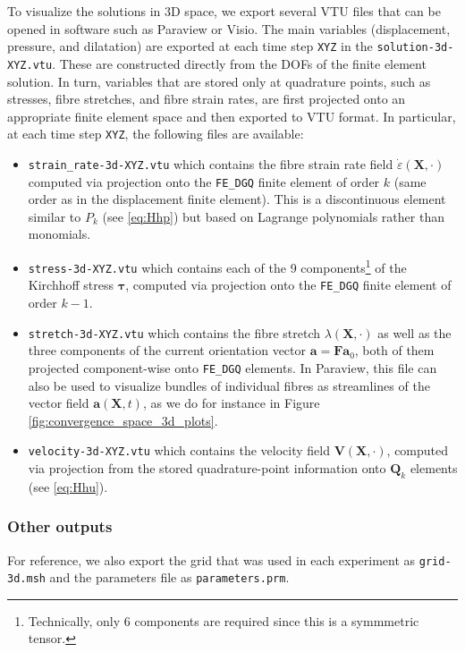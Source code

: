 \documentclass{sfuthesis}
\numberwithin{equation}{section}
\numberwithin{figure}{chapter}
\numberwithin{table}{chapter}
\theoremstyle{definition}
\def\*#1{{\mathbf{#1}}} %
\newcommand{\depsilon}{\dot{\varepsilon}}
\def\btau{{\bm{\tau}}}
\begin{document}
To visualize the solutions in 3D space, we export several VTU files that can be opened in software such as Paraview or Visio. The main variables (displacement, pressure, and dilatation) are exported at each time step \texttt{XYZ} in the \texttt{solution-3d-XYZ.vtu}. These are constructed directly from the DOFs of the finite element solution. In turn, variables that are stored only at quadrature points, such as stresses, fibre stretches, and fibre strain rates, are first projected onto an appropriate finite element space and then exported to VTU format. In particular, at each time step \texttt{XYZ}, the following files are available:
\begin{itemize}
    \item \texttt{strain\_rate-3d-XYZ.vtu} which contains the fibre strain rate field $\depsilon(\*X,\cdot)$ computed via projection onto the \texttt{FE\_DGQ} finite element of order $k$ (same order as in the displacement finite element). This is a discontinuous element similar to $P_k$ (see \eqref{eq:Hhp}) but based on Lagrange polynomials rather than monomials.
    \item \texttt{stress-3d-XYZ.vtu} which contains each of the 9 components\footnote{Technically, only 6 components are required since this is a symmmetric tensor.} of the Kirchhoff stress $\btau$, computed via projection onto the \texttt{FE\_DGQ} finite element of order $k-1$.
    \item \texttt{stretch-3d-XYZ.vtu} which contains the fibre stretch $\lambda(\*X,\cdot)$ as well as the three components of the current orientation vector $\*a = \*F \*a_0$, both of them projected component-wise onto \texttt{FE\_DGQ} elements. In Paraview, this file can also be used to visualize bundles of individual fibres as streamlines of the vector field $\*a(\*X,t)$, as we do for instance in Figure \ref{fig:convergence_space_3d_plots}.
    \item \texttt{velocity-3d-XYZ.vtu} which contains the velocity field $\*V(\*X,\cdot)$, computed via projection from the stored quadrature-point information onto $\*Q_k$ elements (see \eqref{eq:Hhu}).
\end{itemize}

\subsubsection{Other outputs}

For reference, we also export the grid that was used in each experiment as \texttt{grid-3d.msh} and the parameters file as \texttt{parameters.prm}.
\end{document}
